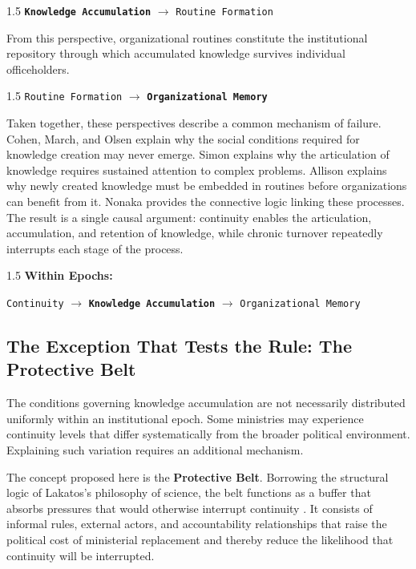 \documentclass[doc, 12pt, a4paper,floatsintext]{apa7}
\begin{document}
\begin{spacing}{1.5}
\noindent
\texttt{\bf Knowledge Accumulation}
$\rightarrow$
\texttt{Routine Formation}
\end{spacing}

From this perspective, organizational routines constitute the institutional repository through which accumulated knowledge survives individual officeholders.

\begin{spacing}{1.5}
\noindent
\texttt{Routine Formation}
$\rightarrow$
\texttt{\bf Organizational Memory}
\end{spacing}

Taken together, these perspectives describe a common mechanism of failure. Cohen, March, and Olsen explain why the social conditions required for knowledge creation may never emerge. Simon explains why the articulation of knowledge requires sustained attention to complex problems. Allison explains why newly created knowledge must be embedded in routines before organizations can benefit from it. Nonaka provides the connective logic linking these processes. The result is a single causal argument: continuity enables the articulation, accumulation, and retention of knowledge, while chronic turnover repeatedly interrupts each stage of the process.

\begin{spacing}{1.5}
\noindent
\textbf{Within Epochs:}

\texttt{Continuity}
$\rightarrow$
\texttt{\bf Knowledge Accumulation}
$\rightarrow$
\texttt{Organizational Memory}
\end{spacing}

\subsection{The Exception That Tests the Rule: The Protective Belt}

The conditions governing knowledge accumulation are not necessarily distributed uniformly within an institutional epoch. Some ministries may experience continuity levels that differ systematically from the broader political environment. Explaining such variation requires an additional mechanism.

The concept proposed here is the \textbf{Protective Belt}. Borrowing the structural logic of Lakatos's philosophy of science, the belt functions as a buffer that absorbs pressures that would otherwise interrupt continuity \parencite{lakatos_methodology_1978}. It consists of informal rules, external actors, and accountability relationships that raise the political cost of ministerial replacement and thereby reduce the likelihood that continuity will be interrupted.
\end{document}
